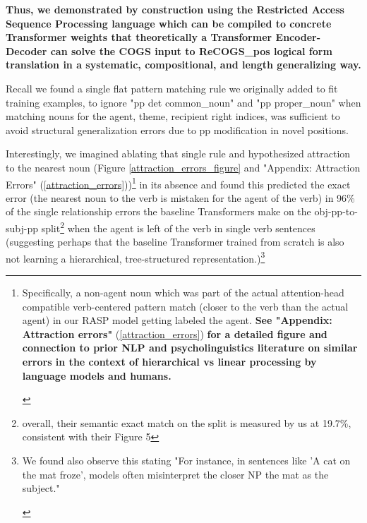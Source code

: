 \documentclass[11pt]{article}
\begin{document}
\textbf{Thus, we demonstrated by construction using the Restricted Access Sequence Processing language which can be compiled to concrete Transformer weights that theoretically a Transformer Encoder-Decoder can solve the COGS input to ReCOGS\_pos logical form translation in a systematic, compositional, and length generalizing way.}

Recall we found a single flat pattern matching rule we originally added to fit training examples, to ignore "pp det common\_noun" and "pp proper\_noun" when matching nouns for the agent, theme, recipient right indices, was sufficient to avoid structural generalization errors due to pp modification in novel positions. 

Interestingly, we imagined ablating that single rule and hypothesized attraction to the nearest noun (Figure \ref{attraction_errors_figure} and "Appendix: Attraction Errors" (\ref{attraction_errors}))\footnote{\begin{footnotesize}Specifically, a non-agent noun which was part of the actual attention-head compatible verb-centered pattern match (closer to the verb than the actual agent) in our RASP model getting labeled the agent. \textbf{See "Appendix: Attraction errors"} (\ref{attraction_errors}) \textbf{for a detailed figure and connection to prior NLP and psycholinguistics literature on similar errors in the context of hierarchical vs linear processing by language models and humans.}
\end{footnotesize}
} in its absence and found this predicted the exact error 
(the nearest noun to the verb is mistaken for the agent of the verb) 
in 96\% of the single relationship errors the \cite{Wu2023} baseline Transformers make on the obj-pp-to-subj-pp split\footnote{overall, their semantic exact match on the split is measured by us at 19.7\%, consistent with their Figure 5} when the agent is left of the verb in single verb sentences
(suggesting perhaps that the baseline \cite{Wu2023} Transformer trained from scratch is also not learning a hierarchical, tree-structured representation.)\footnote{\begin{footnotesize}
We found \cite{li2023slogstructuralgeneralizationbenchmark} also observe 
this stating "For instance, in sentences like 'A cat on the mat froze', models often misinterpret the closer NP the mat as the subject."
\end{footnotesize}
}
\end{document}
